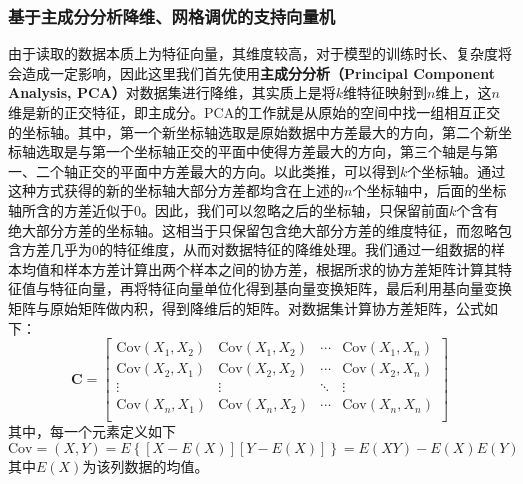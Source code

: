 \documentclass{MathorCupmodeling}
\begin{document}
	\subsubsection{基于主成分分析降维、网格调优的支持向量机}
	由于读取的数据本质上为特征向量，其维度较高，对于模型的训练时长、复杂度将会造成一定影响，因此这里我们首先使用\textbf{主成分分析（Principal Component Analysis, PCA）}对数据集进行降维，其实质上是将$k$维特征映射到$n$维上，这$n$维是新的正交特征，即主成分。PCA的工作就是从原始的空间中找一组相互正交的坐标轴。其中，第一个新坐标轴选取是原始数据中方差最大的方向，第二个新坐标轴选取是与第一个坐标轴正交的平面中使得方差最大的方向，第三个轴是与第一、二个轴正交的平面中方差最大的方向。以此类推，可以得到$k$个坐标轴。通过这种方式获得的新的坐标轴大部分方差都均含在上述的$n$个坐标轴中，后面的坐标轴所含的方差近似于$0$。因此，我们可以忽略之后的坐标轴，只保留前面$k$个含有绝大部分方差的坐标轴。这相当于只保留包含绝大部分方差的维度特征，而忽略包含方差几乎为$0$的特征维度，从而对数据特征的降维处理。我们通过一组数据的样本均值和样本方差计算出两个样本之间的协方差，根据所求的协方差矩阵计算其特征值与特征向量，再将特征向量单位化得到基向量变换矩阵，最后利用基向量变换矩阵与原始矩阵做内积，得到降维后的矩阵。对数据集计算协方差矩阵，公式如下：
	\begin{equation}
		\boldsymbol{C}=\left[ \begin{matrix}
			\text{Cov}\left( X_1,X_2 \right)&		\text{Cov}\left( X_1,X_2 \right)&		\cdots&		\text{Cov}\left( X_1,X_n \right)\\
			\text{Cov}\left( X_2,X_1 \right)&		\text{Cov}\left( X_2,X_2 \right)&		\cdots&		\text{Cov}\left( X_2,X_n \right)\\
			\vdots&		\vdots&		\ddots&		\vdots\\
			\text{Cov}\left( X_n,X_1 \right)&		\text{Cov}\left( X_n,X_2 \right)&		\cdots&		\text{Cov}\left( X_n,X_n \right)\\
		\end{matrix} \right] \label{C}
	\end{equation}
	其中，每一个元素定义如下\textcolor{blue}{\cite{刘建新}}
	\begin{equation}
		\text{Cov}=\left( X,Y \right)=E\left\{\left[X-E\left(X\right)\right]\left[Y-E\left(X\right)\right]\right\}=E\left(XY\right)-E\left(X\right)E\left(Y\right) \label{Cov}
	\end{equation}
	其中$E\left(X\right)$为该列数据的均值。
\end{document}
